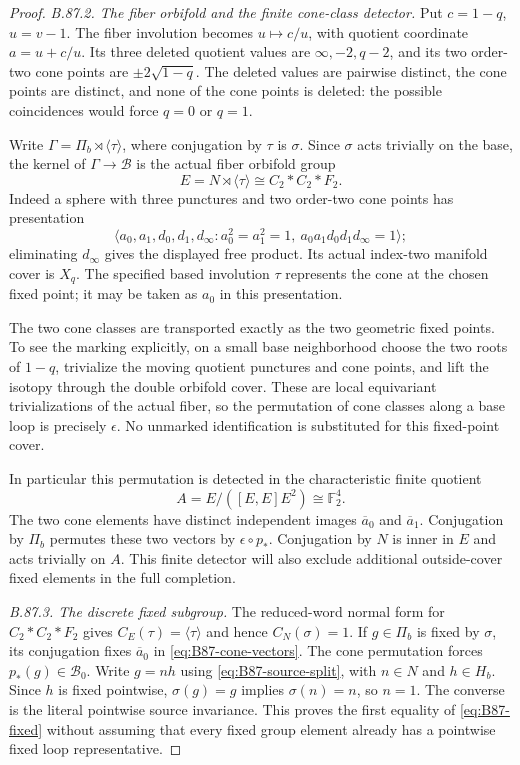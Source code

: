 \begin{proof}
\emph{B.87.2. The fiber orbifold and the finite cone-class detector.}
Put $c=1-q$, $u=v-1$. The fiber involution becomes $u\mapsto c/u$,
with quotient coordinate $a=u+c/u$. Its three deleted quotient values
are $\infty,-2,q-2$, and its two order-two cone points are
$\pm2\sqrt{1-q}$. The deleted values are pairwise distinct, the cone
points are distinct, and none of the cone points is deleted: the possible
coincidences would force $q=0$ or $q=1$.

Write $\Gamma=\Pi_b\rtimes\langle\tau\rangle$, where conjugation
by $\tau$ is $\sigma$. Since $\sigma$ acts trivially on the base,
the kernel of $\Gamma\to\mathcal B$ is the actual fiber orbifold group
\[
 E=N\rtimes\langle\tau\rangle\cong C_2*C_2*F_2.
\]
Indeed a sphere with three punctures and two order-two cone points has
presentation
\[
 \langle a_0,a_1,d_0,d_1,d_\infty:
 a_0^2=a_1^2=1,\ a_0a_1d_0d_1d_\infty=1\rangle;
\]
eliminating $d_\infty$ gives the displayed free product. Its actual
index-two manifold cover is $X_q$. The specified based involution
$\tau$ represents the cone at the chosen fixed point; it may be taken
as $a_0$ in this presentation.

The two cone classes are transported exactly as the two geometric fixed
points. To see the marking explicitly, on a small base neighborhood
choose the two roots of $1-q$, trivialize the moving quotient punctures
and cone points, and lift the isotopy through the double orbifold cover.
These are local equivariant trivializations of the actual fiber, so the
permutation of cone classes along a base loop is precisely $\epsilon$.
No unmarked identification is substituted for this fixed-point cover.

In particular this permutation is detected in the characteristic finite
quotient
\begin{equation}\label{eq:B87-cone-vectors}
 A=E/([E,E]E^2)\cong\mathbb F_2^4.
\end{equation}
The two cone elements have distinct independent images $\overline a_0$
and $\overline a_1$. Conjugation by $\Pi_b$ permutes these two vectors
by $\epsilon\circ p_*$. Conjugation by $N$ is inner in $E$ and acts
trivially on $A$. This finite detector will also exclude additional
outside-cover fixed elements in the full completion.

\emph{B.87.3. The discrete fixed subgroup.}
The reduced-word normal form for $C_2*C_2*F_2$ gives
$C_E(\tau)=\langle\tau\rangle$ and hence $C_N(\sigma)=1$.
If $g\in\Pi_b$ is fixed by $\sigma$, its conjugation fixes
$\overline a_0$ in \eqref{eq:B87-cone-vectors}. The cone permutation
forces $p_*(g)\in\mathcal B_0$. Write $g=nh$ using
\eqref{eq:B87-source-split}, with $n\in N$ and $h\in H_b$.
Since $h$ is fixed pointwise, $\sigma(g)=g$ implies $\sigma(n)=n$,
so $n=1$. The converse is the literal pointwise source invariance.
This proves the first equality of \eqref{eq:B87-fixed} without assuming
that every fixed group element already has a pointwise fixed loop
representative.


\end{proof}

